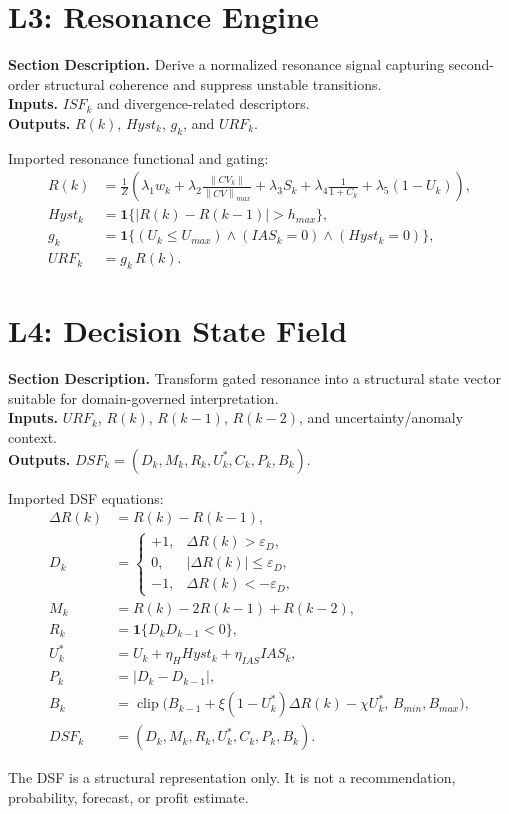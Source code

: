 \documentclass[11pt]{report}
\newcommand{\clip}{\operatorname{clip}}
\newcommand{\norm}[1]{\left\lVert #1 \right\rVert}
\newcommand{\meta}[3]{\textbf{Section Description.} #1\\
\textbf{Inputs.} #2\\
\textbf{Outputs.} #3\par}
\begin{document}
\section{L3: Resonance Engine}
\meta{Derive a normalized resonance signal capturing second-order structural coherence and suppress unstable transitions.}{$ISF_k$ and divergence-related descriptors.}{$R(k)$, $Hyst_k$, $g_k$, and $URF_k$.}

Imported resonance functional and gating:
\begin{align*}
R(k) &= \frac{1}{Z}\left(\lambda_1w_k + \lambda_2\frac{\norm{CV_k}}{\norm{CV}_{max}} + \lambda_3S_k + \lambda_4\frac{1}{1+C_k} + \lambda_5(1-U_k)\right),\\
Hyst_k &= \mathbf{1}\{|R(k)-R(k-1)|>h_{max}\},\\
g_k &= \mathbf{1}\{(U_k\le U_{max})\wedge(IAS_k=0)\wedge(Hyst_k=0)\},\\
URF_k &= g_k\,R(k).
\end{align*}

\section{L4: Decision State Field}
\meta{Transform gated resonance into a structural state vector suitable for domain-governed interpretation.}{$URF_k$, $R(k)$, $R(k-1)$, $R(k-2)$, and uncertainty/anomaly context.}{$DSF_k=(D_k,M_k,R_k,U_k^{\ast},C_k,P_k,B_k)$.}

Imported DSF equations:
\begin{align*}
\Delta R(k) &= R(k)-R(k-1),\\
D_k &= \begin{cases}+1,& \Delta R(k)>\varepsilon_D,\\0,& |\Delta R(k)|\le \varepsilon_D,\\-1,& \Delta R(k)<-\varepsilon_D,\end{cases}\\
M_k &= R(k)-2R(k-1)+R(k-2),\\
R_k &= \mathbf{1}\{D_kD_{k-1}<0\},\\
U_k^{\ast} &= U_k + \eta_HHyst_k + \eta_{IAS}IAS_k,\\
P_k &= |D_k-D_{k-1}|,\\
B_k &= \clip\big(B_{k-1}+\xi(1-U_k^{\ast})\Delta R(k)-\chi U_k^{\ast},\,B_{min},B_{max}\big),\\
DSF_k &= (D_k,M_k,R_k,U_k^{\ast},C_k,P_k,B_k).
\end{align*}

The DSF is a structural representation only. It is not a recommendation, probability, forecast, or profit estimate.
\end{document}
